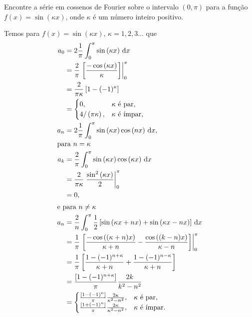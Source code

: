 \documentclass[a4paper,12pt, leqno, answers]{exam}
\begin{document}
\begin{questions}
    \question[T1 de 2011] Encontre a s\'{e}rie em cossenos de Fourier sobre o intervalo $(0, \pi)$ para a fun\c{c}\~{a}o $f(x) = \sin\left( \kappa x \right)$, onde $\kappa$ \'{e} um n\'{u}mero inteiro positivo.
    \begin{solution}
        Temos para $f(x) = \sin\left( \kappa x \right)$, $\kappa = 1, 2, 3 \ldots$ que
        \begin{align*}
            a_0 &= 2 \frac{1}{\pi} \int_0^\pi \sin\left( \kappa x \right) \, \mathrm{d}x \\
            &= \frac{2}{\pi} \left. \left[ \frac{-\cos\left( \kappa x \right)}{\kappa} \right] \right|_0^\pi \\
            &= \frac{2}{\pi \kappa} \left[ 1 - (-1)^\kappa \right] \\
            &= \begin{cases}
                0, & \kappa \text{ \'{e} par}, \\
                4 / \left( \pi \kappa \right), & \kappa \text{ \'{e} \'{i}mpar},
            \end{cases} \\
            a_n &= 2 \frac{1}{\pi} \int_0^\pi \sin\left( \kappa x \right) \cos\left( n x \right) \, \mathrm{d}x, \\
            \intertext{para $n = \kappa$}
            a_k &= \frac{2}{\pi} \int_0^\pi \sin\left( \kappa x \right) \cos\left( \kappa x \right) \, \mathrm{d}x \\
            &= \frac{2}{\pi \kappa} \left. \frac{\sin^2\left( \kappa x \right)}{2} \right|_0^\pi \\
            &= 0, \\
            \intertext{e para $n \neq \kappa$}
            a_n &= \frac{2}{n} \int_0^\pi \frac{1}{2} \left[ \sin\left( \kappa x + n x \right) + \sin\left( \kappa x - n x \right) \right] \, \mathrm{d}x \\
            &= \frac{1}{\pi} \left. \left[ \frac{- \cos\left( (\kappa + n) x \right)}{\kappa + n} - \frac{\cos\left( (k - n) x \right)}{\kappa - n} \right] \right|_0^\pi \\
            &= \frac{1}{\pi} \left[ \frac{1 - (-1)^{n + \kappa}}{\kappa + n} + \frac{1 - (-1)^{n - \kappa}}{\kappa + n} \right] \\
            &= \frac{\left[ 1 - (-1)^{n + \kappa} \right]}{\pi} \frac{2 k}{k^2 - n^2} \\
            &= \begin{cases}
                \frac{\left[ 1 - (-1)^n \right]}{\pi} \frac{2 \kappa}{\kappa^2 - n^2}, & \kappa \text{ \'{e} par}, \\
                \frac{\left[ 1 + (-1)^n \right]}{\pi} \frac{2 \kappa}{\kappa^2 - n^2}, & \kappa \text{ \'{e} \'{i}mpar}.
            \end{cases}
        \end{align*}


\end{solution}
\end{questions}
\end{document}
